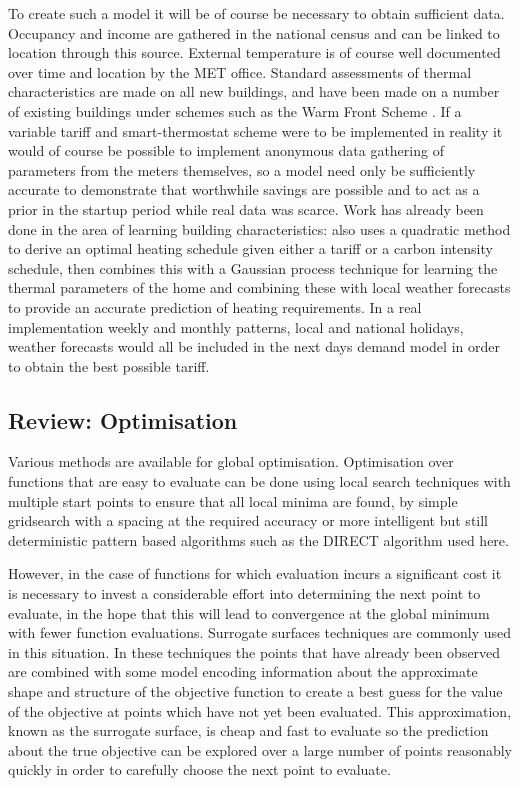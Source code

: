 \documentclass[a4paper, 10 pt, conference]{ieeeconf}  %
\begin{document}
To create such a model it will be of course be necessary to obtain sufficient data. Occupancy and income are gathered in the national census and can be linked to location through this source. External temperature is of course well documented over time and location by the MET office. Standard assessments of thermal characteristics are made on all new buildings, and have been made on a number of existing buildings under schemes such as the Warm Front Scheme \cite{warmfront}. If a variable tariff and smart-thermostat scheme were to be implemented in reality it would of course be possible to implement anonymous data gathering of parameters from the meters themselves, so a model need only be sufficiently accurate to demonstrate that worthwhile savings are possible and to act as a prior in the startup period while real data was scarce. Work has already been done in the area of learning building characteristics: \cite{rogers2011adaptive} also uses a quadratic method to derive an optimal heating schedule given either a tariff or a carbon intensity schedule, then combines this with a Gaussian process technique for learning the thermal parameters of the home and combining these with local weather forecasts to provide an accurate prediction of heating requirements. In a real implementation weekly and monthly patterns, local and national holidays, weather forecasts would all be included in the next days demand model in order to obtain the best possible tariff.


\subsection{Review: Optimisation}
\label{reviewoptimisation}
Various methods are available for global optimisation. Optimisation over functions that are easy to evaluate can be done using local search techniques with multiple start points to ensure that all local minima are found, by simple gridsearch with a spacing at the required accuracy or more intelligent but still deterministic pattern based algorithms such as the DIRECT algorithm \cite{jones1993lipschitzian} used here. %

However, in the case of functions for which evaluation incurs a significant cost it is necessary to invest a considerable effort into determining the next point to evaluate, in the hope that this will lead to convergence at the global minimum with fewer function evaluations. Surrogate surfaces techniques are commonly used in this situation. In these techniques the points that have already been observed are combined with some model encoding information about the approximate shape and structure of the objective function to create a best guess for the value of the objective at points which have not yet been evaluated. This approximation, known as the surrogate surface, is cheap and fast to evaluate so the prediction about the true objective can be explored over a large number of points reasonably quickly in order to carefully choose the next point to evaluate.
\end{document}
